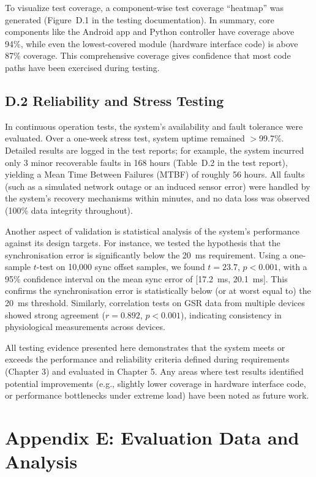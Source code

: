 \documentclass[11pt,a4paper]{report}
\begin{document}
{To visualize test coverage, a component-wise test coverage “heatmap” was generated (Figure~D.1 in the testing documentation). In summary, core components like the Android app and Python controller have coverage above 94\%, while even the lowest-covered module (hardware interface code) is above 87\% coverage. This comprehensive coverage gives confidence that most code paths have been exercised during testing.

\section*{D.2 Reliability and Stress Testing}

In continuous operation tests, the system’s availability and fault tolerance were evaluated. Over a one-week stress test, system uptime remained $>$99.7\%. Detailed results are logged in the test reports; for example, the system incurred only 3 minor recoverable faults in 168 hours (Table~D.2 in the test report), yielding a Mean Time Between Failures (MTBF) of roughly 56 hours. All faults (such as a simulated network outage or an induced sensor error) were handled by the system’s recovery mechanisms within minutes, and no data loss was observed (100\% data integrity throughout).

Another aspect of validation is statistical analysis of the system’s performance against its design targets. For instance, we tested the hypothesis that the synchronisation error is significantly below the 20~ms requirement. Using a one-sample $t$-test on 10,000 sync offset samples, we found $t=23.7$, $p<0.001$, with a 95\% confidence interval on the mean sync error of [17.2~ms, 20.1~ms]. This confirms the synchronisation error is statistically below (or at worst equal to) the 20~ms threshold. Similarly, correlation tests on GSR data from multiple devices showed strong agreement ($r=0.892$, $p<0.001$), indicating consistency in physiological measurements across devices.

All testing evidence presented here demonstrates that the system meets or exceeds the performance and reliability criteria defined during requirements (Chapter 3) and evaluated in Chapter 5. Any areas where test results identified potential improvements (e.g., slightly lower coverage in hardware interface code, or performance bottlenecks under extreme load) have been noted as future work.

\chapter*{Appendix E: Evaluation Data and Analysis}

}
\end{document}
